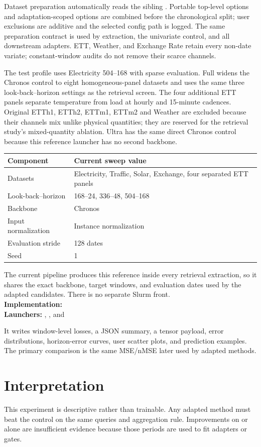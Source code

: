 \documentclass[10pt]{article}
\begin{document}
Dataset preparation automatically reads the sibling .
Portable top-level options and adaptation-scoped options are combined before
the chronological split; user exclusions are additive and the selected config
path is logged. The same preparation contract is used by extraction, the
univariate control, and all downstream adapters. ETT, Weather, and Exchange
Rate retain every non-date variate; constant-window audits do not remove their
scarce channels.

The test profile uses Electricity 504--168 with sparse evaluation. Full widens
the Chronos control to eight homogeneous-panel datasets and uses the same three
look-back--horizon settings as the retrieval screen. The four additional ETT
panels separate temperature from load at hourly and 15-minute cadences.
Original ETTh1, ETTh2, ETTm1, ETTm2 and Weather are excluded because their
channels mix unlike physical quantities; they are reserved for the retrieval
study's mixed-quantity ablation. Ultra has the same direct Chronos control
because this reference launcher has no second backbone.

\begin{table}[h]
\centering
\begin{tabular}{ll}
\toprule
Component & Current sweep value \\
\midrule
Datasets & Electricity, Traffic, Solar, Exchange, four separated ETT panels \\
Look-back--horizon & 168--24, 336--48, 504--168 \\
Backbone & Chronos \\
Input normalization & Instance normalization \\
Evaluation stride & 128 dates \\
Seed & 1 \\
\bottomrule
\end{tabular}
\end{table}

The current pipeline produces this reference inside every retrieval extraction,
so it shares the exact backbone, target windows, and evaluation dates used by
the adapted candidates. There is no separate Slurm front.\\
\textbf{Implementation:} \\
\textbf{Launchers:} , , and

It writes window-level losses,
a JSON summary, a tensor payload, error distributions, horizon-error curves,
user scatter plots, and prediction examples.  The primary comparison is the
same \Tthree MSE/nMSE later used by adapted methods.

\section{Interpretation}
This experiment is descriptive rather than trainable.  Any adapted method must
beat the control on the same queries and aggregation rule.  Improvements on
\Tone or \Ttwo alone are insufficient evidence because those periods are used
to fit adapters or gates.
\end{document}
